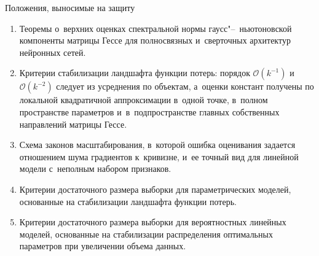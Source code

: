 \documentclass[aspectratio=169]{beamer}
\begin{document}
\begin{frame}{Положения, выносимые на защиту}
    \begin{enumerate}
        \item Теоремы о~верхних оценках спектральной нормы гаусс"--~ньютоновской компоненты матрицы Гессе для полносвязных и~сверточных архитектур нейронных сетей.
        \item Критерии стабилизации ландшафта функции потерь: порядок $\mathcal O(k^{-1})$ и~$\mathcal O(k^{-2})$ следует из усреднения по объектам, а~оценки констант получены по локальной квадратичной аппроксимации в~одной точке, в~полном пространстве параметров и~в~подпространстве главных собственных направлений матрицы Гессе.
        \item Схема законов масштабирования, в~которой ошибка оценивания задается отношением шума градиентов к~кривизне, и~ее точный вид для линейной модели с~неполным набором признаков.
        \item Критерии достаточного размера выборки для параметрических моделей, основанные на стабилизации ландшафта функции потерь.
        \item Критерии достаточного размера выборки для вероятностных линейных моделей, основанные на стабилизации распределения оптимальных параметров при увеличении объема данных.
    \end{enumerate}
\end{frame}
\end{document}
